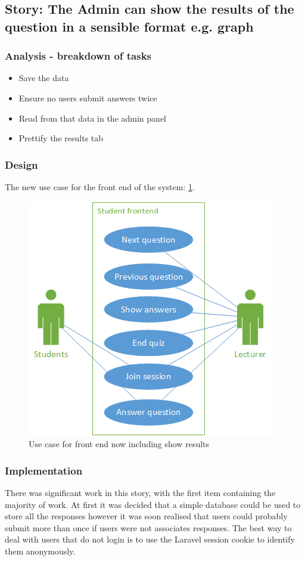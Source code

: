 \subsection{Story: The Admin can show the results of the question in a sensible format e.g. graph}
\subsubsection{Analysis - breakdown of tasks}
\begin{itemize}
	\item Save the data
	\item Ensure no users submit answers twice
	\item Read from that data in the admin panel
	\item Prettify the results tab
\end{itemize}
\subsubsection{Design}
The new use case for the front end of the system: \ref{fig:iter-6-frontend-use-case}.
\begin{figure}
	\caption{Use case for front end now including show results}
	\centerline{\includegraphics{Chapter2/Iter-6/iter-6-frontend-use-case}}
	\label{fig:iter-6-frontend-use-case}
\end{figure}
\subsubsection{Implementation}
There was significant work in this story, with the first item containing the majority of work. At first it was decided that a simple database could be used to store all the responses however it was soon realised that users could probably submit more than once if users were not associates responses. The best way to deal with users that do not login is to use the Laravel session cookie to identify them anonymously.

